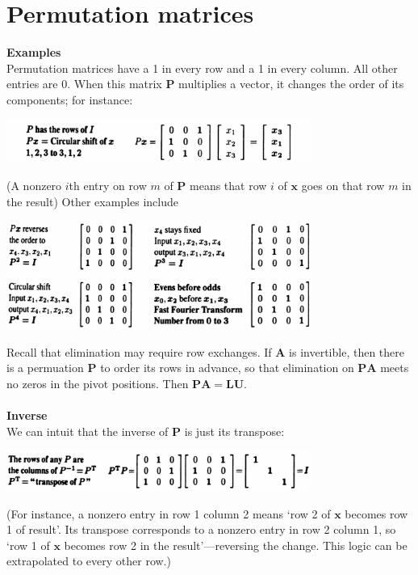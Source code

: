 \documentclass{report}
\begin{document}
\section{Permutation matrices}
\textbf{Examples}\\
Permutation matrices have a 1 in every row and a 1 in every column. All other entries are 0. When this matrix $\bm P$ multiplies a vector, it changes the order of 
its components; for instance:
\begin{center}
\includegraphics[width=10cm]{12}
\end{center}
(A nonzero $i$th entry on row $m$ of $\bm P$ means that row $i$ of $\bm x$ goes on that row $m$ in the result) Other examples include
\begin{center}
\includegraphics[width=10cm]{13}
\end{center}
Recall that elimination may require row exchanges. If $\bm A$ is invertible, then there is a permuation $\bm P$ to order its rows in advance, so that elimination
on $\bm{PA}$ meets no zeros in the pivot positions. Then $\bm{PA}=\bm{LU}$.\\
\vspace{1mm}\\
\textbf{Inverse}\\
We can intuit that the inverse of $\bm P$ is just its transpose:
\begin{center}
\includegraphics[width=10cm]{14}
\end{center}
(For instance, a nonzero entry in row 1 column 2 means `row 2 of $\bm x$ becomes row 1 of result'. Its transpose corresponds to a nonzero entry in 
row 2 column 1, so `row 1 of $\bm x$ becomes row 2 in the result'---reversing the change. This logic can be extrapolated to every other row.)\\
\end{document}
